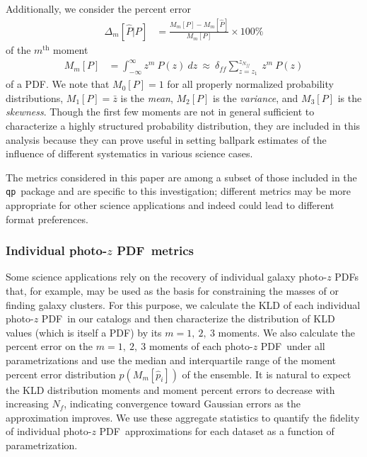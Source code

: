\documentclass[\docopts]{\docclass}
\newcommand{\qp}{\texttt{qp}}
\newcommand{\pz}{photo-$z$ PDF}
\begin{document}
Additionally, we consider the percent error
\begin{align}
  \label{eq:percent_error}
  \Delta_{m}[\hat{P} | P] &= \frac{M_{m}[P] - 
M_{m}[\hat{P}]}{M_{m}[P]}\times100\%
\end{align}
of the $m^{\mathrm{th}}$ moment
\begin{align}
  \label{eq:moment}
  M_{m}[P] &= \int_{-\infty}^{\infty} z^{m}\ P(z)\ dz\ \approx\  
\delta_{ff}\sum_{z=z_{1}}^{z_{N_{ff}}}\ z^{m}\ P(z)
\end{align}
of a PDF.
We note that $M_{0}[P]=1$ for all properly normalized probability 
distributions, $M_{1}[P]=\bar{z}$ is the \textit{mean}, $M_{2}[P]$ is the 
\textit{variance}, and $M_{3}[P]$ is the \textit{skewness}.
Though the first few moments are not in general sufficient to characterize a 
highly structured probability distribution, they are included in this analysis 
because they can prove useful in setting ballpark estimates of the influence of 
different systematics in various science cases.

The metrics considered in this paper are among a subset of those included in 
the \qp\ package and are specific to this investigation; different metrics may 
be more appropriate for other science applications and indeed could lead to 
different format preferences.

\subsubsection{Individual \pz\ metrics}
\label{sec:individual_metric}

Some science applications rely on the recovery of individual galaxy \pz s that, 
for example, may be used as the basis for constraining the masses of 
\citep{applegate_weighing_2014} or finding \citep{radovich_searching_2017} 
galaxy clusters.
For this purpose, we calculate the KLD of each individual \pz\ in our catalogs 
and then characterize the distribution of KLD values (which is itself a PDF) by 
its $m=1,\ 2,\ 3$ moments.
We also calculate the percent error on the $m=1,\ 2,\ 3$ moments of each \pz\ 
under all parametrizations and use the median and interquartile range of the 
moment percent error distribution $p(M_{m}[\hat{p}_{i}])$ of the ensemble.
It is natural to expect the KLD distribution moments and moment percent errors 
to decrease with increasing $N_{f}$, indicating convergence toward Gaussian 
errors as the approximation improves.
We use these aggregate statistics to quantify the fidelity of individual \pz\ 
approximations for each dataset as a function of parametrization.
\end{document}
